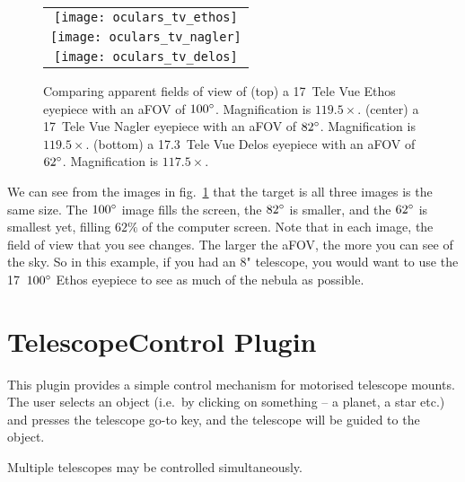 \begin{figure}[p]\centering
\begin{tabular}{c}
\texttt{[image: oculars\_tv\_ethos]}\\
\texttt{[image: oculars\_tv\_nagler]}\\
\texttt{[image: oculars\_tv\_delos]}
\end{tabular}
\caption{Comparing apparent fields of view of (top) a 17\mm\ Tele Vue Ethos eyepiece with an aFOV of $100\degree$. Magnification is $119.5\times$.
(center) a 17\mm\ Tele Vue Nagler eyepiece with an aFOV of $82\degree$. Magnification is $119.5\times$.
(bottom) a 17.3\mm\ Tele Vue Delos eyepiece with an aFOV of $62\degree$. Magnification is $117.5\times$.}
\label{fig:plugins:Oculars:TeleVue}
\end{figure}


We can see from the images in fig.~\ref{fig:plugins:Oculars:TeleVue}
that the target is all three images is the same size. The $100\degree$ image fills the screen, 
the $82\degree$ is smaller, and the $62\degree$ is smallest yet, filling $62\%$ of the computer screen. 
Note that in each image, the field of view that you see changes. The larger the aFOV, the more you can see of the sky. 
So in this example, if you had an 8" telescope, you would want to use the 17\mm\ $100\degree$ Ethos eyepiece to see as much of the nebula as possible.

\newpage
\section{TelescopeControl Plugin}
\label{sec:plugins:TelescopeControl}

This plugin provides a simple control mechanism for motorised
telescope mounts. The user selects an object (i.e.\ by clicking on
something -- a planet, a star etc.) and presses the telescope go-to
key, and the telescope will be guided to the object.

Multiple telescopes may be controlled simultaneously. 

% 
% 

